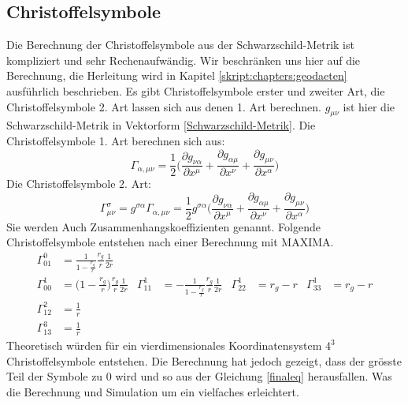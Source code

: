 \begin{refsection}
	\subsection{Christoffelsymbole}\label{christoffel}
	Die Berechnung der Christoffelsymbole aus der Schwarzschild-Metrik ist kompliziert und sehr Rechenaufwändig. Wir beschränken uns hier auf die Berechnung, die Herleitung wird in Kapitel \ref{skript:chapters:geodaeten} ausführlich beschrieben. Es gibt Christoffelsymbole erster und zweiter Art, die Christoffelsymbole 2. Art lassen sich aus denen 1. Art berechnen.
	$g_{\mu\nu}$ ist hier die Schwarzschild-Metrik in Vektorform \ref{Schwarzschild-Metrik}.
	Die Christoffelsymbole 1. Art berechnen sich aus:
	\begin{equation}
		\Gamma_{\alpha,\mu\nu} 
		= 
		\frac{1}{2}\biggl(\frac{\partial g_{\nu\alpha}}{\partial x^{\mu}} 
		+
		\frac{\partial g_{\alpha\mu}}{\partial x^{\nu}}
		+
		\frac{\partial g_{\mu\nu}}{\partial x^{\alpha}}
		 \biggr)
	\end{equation}
	Die Christoffelsymbole 2. Art:
	\begin{equation}
	\Gamma^{\sigma}_{\mu\nu} 
	= 
	g^{\sigma\alpha}\Gamma_{\alpha,\mu\nu} 
	=
	\frac{1}{2}g^{\sigma\alpha}\biggl(\frac{\partial g_{\nu\alpha}}{\partial x^{\mu}} 
	+
	\frac{\partial g_{\alpha\mu}}{\partial x^{\nu}}
	+
	\frac{\partial g_{\mu\nu}}{\partial x^{\alpha}}
	\biggr)
	\end{equation}
	Sie werden Auch Zusammenhangskoeffizienten genannt.
	Folgende Christoffelsymbole entstehen nach einer Berechnung mit MAXIMA.
	\begin{align*}
	\Gamma^0_{01}
	&=
	\frac{1}{1-\displaystyle\frac{r_g}{r}}
	\frac{r_g}{r}
	\frac{1}{2r}
	\\
	\Gamma^1_{00}
	&=
	\biggl(1-\displaystyle\frac{r_g}{r}\biggr)
	\frac{r_g}{r}
	\frac{1}{2r}
	&
	\Gamma^1_{11}
	&=
	-\frac1{1-\displaystyle\frac{r_g}{r}}
	\frac{r_g}{r}
	\frac{1}{2r}
	&
	\Gamma^1_{22}
	&=
	r_g-r
	&
	\Gamma^1_{33}
	&=
	r_g-r
	\\
	\Gamma^2_{12}
	&=
	\frac1r
	\\
	\Gamma^3_{13}
	&=
	\frac1r
	\end{align*}
	Theoretisch würden für ein vierdimensionales Koordinatensystem $4^{3}$ Christoffelsymbole entstehen. Die Berechnung hat jedoch gezeigt, dass der grösste Teil der Symbole zu $0$ wird und so aus der Gleichung \ref{finaleq} herausfallen. Was die Berechnung und Simulation um ein vielfaches erleichtert.
		

\end{refsection}

